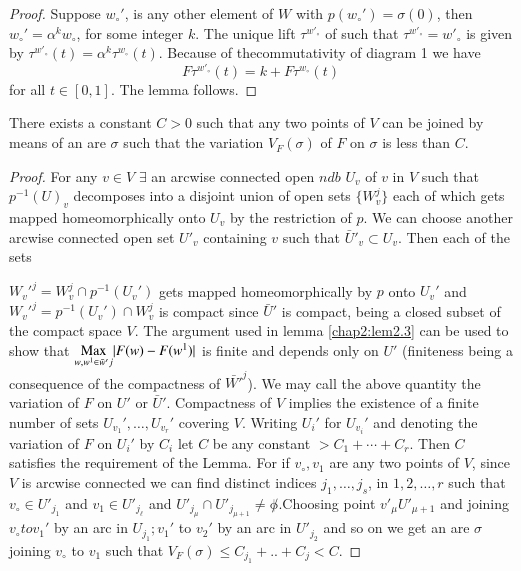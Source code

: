 \begin{proof}
Suppose $w_\circ'$, is any other element of $W$  with $p(w_\circ') =\sigma
(0)$, then $w_\circ' = \alpha^{k} w_\circ$, for some integer $k$. The unique
lift $\tau^{w'_\circ}$ of such that $\tau^{w'_\circ} = w'_\circ$ is given by
$\tau^{w'_\circ} (t) = \alpha^{k} \tau^{w_\circ} (t)$.  Because of
the\pageoriginale commutativity of diagram 1 we have  
$$
F \tau^{w'_\circ} (t) = k + F \tau^{w_\circ} (t) 
$$
for all $t \in[0, 1]$. The lemma follows.
\end{proof}

\begin{lemma}\label{chap2:lem2.4}%
There exists a constant $C > 0$ such that any two points of $V$ can be
joined by means of an are $\sigma$ such that the variation $V_{F}
(\sigma)$ of $F$ on $\sigma$ is less than $C$. 
\end{lemma}

\begin{proof}
For any $v \in V$ $\exists$ an arcwise connected  open $ndb$ $U_{v}$
of $v$ in $V$ such that $p^{-1} (U)_v$ decomposes into a disjoint
union of open sets $\{ W^{j}_{v} \}$ each of which gets mapped
homeomorphically onto $U_{v}$ by the restriction of $p$. We can choose
another arcwise connected open set $U'_{v}$ containing $v$ such that
$\bar{U}'_{v} \subset U_{v}$. Then each of the sets 

$W_{v}'^{j} = W_{v}^{j} \cap p^{-1}(U_{v}')$  gets mapped
homeomorphically by $p$ onto $U_{v}'$ and $W_{v}'^{j} =
p^{-1}(U_{v}')\cap W^{j}_{v}$ is compact since $\bar{U}'$ is compact,
being a closed subset of the compact space $V$. The argument used in
lemma \ref{chap2:lem2.3} can be used to show that $\underset{w, w^1
  \in \bar{w}' j}{\operatorname{Max}}| 
F(w) - F(w^1) |$ is finite and depends  only on $U'$ (finiteness being
a consequence of the compactness of $\bar{W'}^j $).  We may call the
above quantity the variation of $F$ on $ U'$ or $\bar{U}'$.
Compactness of $V$ implies the existence of a finite number of sets
$U_{v_{1}}', \ldots , U_{v_{r}}'$  covering $V$. Writing $U_i'$ for
$U_{v_{i}}'$ and denoting the variation of $F$ on $U_i'$ by $C_i$ let
$C$ be any constant $ > C_1 + \cdots  + C_r$. Then $C$ satisfies the
requirement of the Lemma. For if $v_{\circ}, v_{1}$ are  any two points
of $V$, since $V$ is arcwise connected we can find distinct indices
$j_{1}, \ldots , j_s$, in $1, 2, \ldots, r$ such that $v_{\circ}\in
U'_{j_1}$ and  $v_{1} \in U'_{j_{\ell}}$ and $U'_{j_{\mu}} \cap
U'_{j_{\mu+1}} \neq \not\phi$.\pageoriginale Choosing point $v'_{\mu}
U'_{\mu +1}$ and 
joining $v_{\circ} to v_{1}'$ by an arc in $U_{j_{1}} ; v_{1}'$ to
$v_{2}'$ by an arc in $U'_{j_{2}}$ and so on  we get an are $\sigma$
joining $v_{\circ}$ to $v_{1}$ such that $V_{F} (\sigma) \leq C_{j_{1}} +..+
C_{j} < C$. 
\end{proof}

